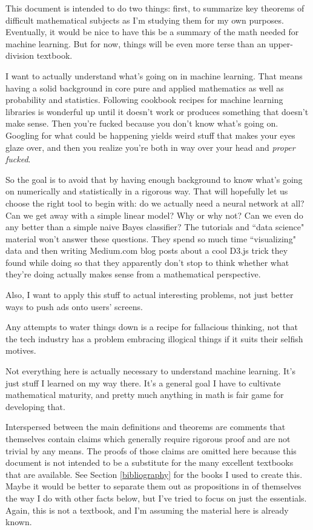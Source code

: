 \documentclass{article}
\theoremstyle{definition}
\begin{document}
This document is intended to do two things: first, to summarize key theorems of difficult mathematical subjects as I'm studying them for my own purposes. Eventually, it would be nice to have this be a summary of the math needed for machine learning. But for now, things will be even more terse than an upper-division textbook.

I want to actually understand what's going on in machine learning. That means having a solid background in core pure and applied mathematics as well as probability and statistics. Following cookbook recipes for machine learning libraries is wonderful up until it doesn't work or produces something that doesn't make sense. Then you're fucked because you don't know what's going on. Googling for what could be happening yields weird stuff that makes your eyes glaze over, and then you realize you're both in way over your head and \emph{proper fucked}.

So the goal is to avoid that by having enough background to know what's going on numerically and statistically in a rigorous way. That will hopefully let us choose the right tool to begin with: do we actually need a neural network at all? Can we get away with a simple linear model? Why or why not? Can we even do any better than a simple naive Bayes classifier? The tutorials and ``data science" material won't answer these questions. They spend so much time ``visualizing" data and then writing Medium.com blog posts about a cool D3.js trick they found while doing so that they apparently don't stop to think whether what they're doing actually makes sense from a mathematical perspective.

Also, I want to apply this stuff to actual interesting problems, not just better ways to push ads onto users' screens.

Any attempts to water things down is a recipe for fallacious thinking, not that the tech industry has a problem embracing illogical things if it suits their selfish motives.

Not everything here is actually necessary to understand machine learning. It's just stuff I learned on my way there. It's a general goal I have to cultivate mathematical maturity, and pretty much anything in math is fair game for developing that.

Interspersed between the main definitions and theorems are comments that themselves contain claims which generally require rigorous proof and are not trivial by any means. The proofs of those claims are omitted here because this document is not intended to be a substitute for the many excellent textbooks that are available. See Section \ref{bibliography} for the books I used to create this. Maybe it would be better to separate them out as propositions in of themselves the way I do with other facts below, but I've tried to focus on just the essentials. Again, this is not a textbook, and I'm assuming the material here is already known.
\end{document}
